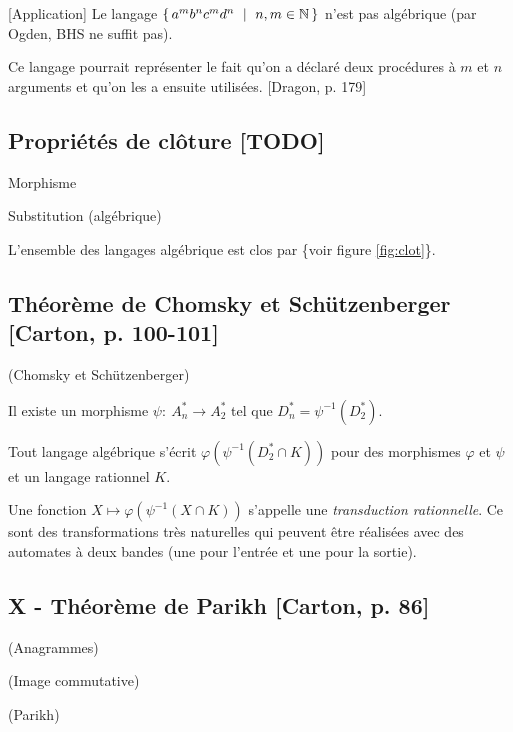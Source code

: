 \documentclass[../../agregation.tex]{subfiles}
\begin{document}
\begin{example}
	{[}Application{]} Le langage $\set{a^{m}b^{n}c^{m}d^{n}\ |\ n,m\in\mathbb{N}}$
	n'est pas algébrique (par Ogden, BHS ne suffit pas).
	
	Ce langage pourrait représenter le fait qu'on a déclaré deux procédures
	à $m$ et $n$ arguments et qu'on les a ensuite utilisées. {[}Dragon,
	p. 179{]}
\end{example}

\subsection{Propriétés de clôture {[}TODO{]}}
\begin{defn}
	Morphisme
\end{defn}

\begin{defn}
	Substitution (algébrique)\end{defn}
\begin{prop}
	L'ensemble des langages algébrique est clos par \{voir figure \ref{fig:clot}\}.
\end{prop}

\subsection{Théorème de Chomsky et Schützenberger {[}Carton, p. 100-101{]}}
\begin{thm}
	(Chomsky et Schützenberger)\end{thm}
\begin{lem}
	Il existe un morphisme $\psi:\ A_{n}^{*}\to A_{2}^{*}$ tel que $D_{n}^{*}=\psi^{-1}\left(D_{2}^{*}\right)$.\end{lem}
\begin{cor}
	Tout langage algébrique s'écrit $\varphi\left(\psi^{-1}\left(D_{2}^{*}\cap K\right)\right)$
	pour des morphismes $\varphi$ et $\psi$ et un langage rationnel
	$K$.\end{cor}
\begin{rem}
	Une fonction $X\mapsto\varphi\left(\psi^{-1}\left(X\cap K\right)\right)$
	s'appelle une \emph{transduction rationnelle}. Ce sont des transformations
	très naturelles qui peuvent être réalisées avec des automates à deux
	bandes (une pour l'entrée et une pour la sortie).
\end{rem}

\subsection{X - Théorème de Parikh {[}Carton, p. 86{]}}
\begin{defn}
	(Anagrammes)
\end{defn}

\begin{defn}
	(Image commutative)\end{defn}
\begin{thm}
	(Parikh)
\end{thm}


\ifallthenelse{
	\dvts
}{}
\end{document}
